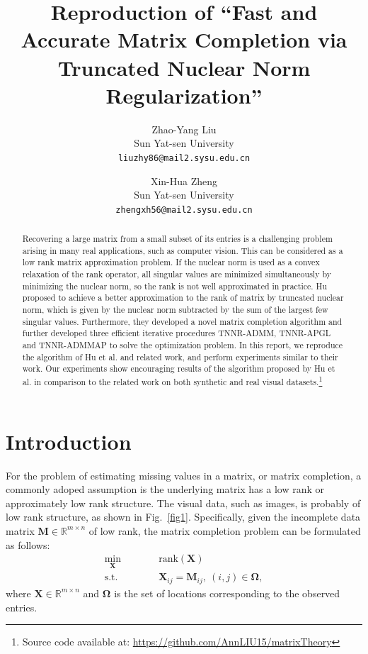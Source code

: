 \documentclass{article}
\title{Reproduction of ``Fast and Accurate Matrix Completion via Truncated Nuclear Norm Regularization''}
\author{%
  Zhao-Yang Liu\\ %
    Sun Yat-sen University \\
  \texttt{liuzhy86@mail2.sysu.edu.cn} \\
  \and
  Xin-Hua Zheng \\
  Sun Yat-sen University \\
  \texttt{zhengxh56@mail2.sysu.edu.cn} \\
}
\begin{document}
{

\maketitle

\begin{abstract}
Recovering a large matrix from a small subset of its entries is a challenging problem arising in many real applications, such as computer vision. This can be considered as a low rank matrix approximation problem. If the nuclear norm is used as a convex relaxation of the rank operator, all singular values are minimized simultaneously by minimizing the nuclear norm, so the rank is not well approximated in practice. 
Hu proposed to achieve a better approximation to the rank of matrix by truncated nuclear norm, which is given by the nuclear norm subtracted by the sum of the largest few singular values. Furthermore, they developed a novel matrix completion algorithm and further developed three efficient iterative procedures TNNR-ADMM, TNNR-APGL and TNNR-ADMMAP to solve the optimization problem.
In this report, we reproduce the algorithm of Hu et al. and related work, and perform experiments similar to their work. Our experiments show encouraging results of the algorithm proposed by Hu et al. in comparison to the related work on both synthetic and real visual datasets.\footnote{Source code available at: \url{https://github.com/AnnLIU15/matrixTheory}}
\end{abstract}


\section{Introduction}
For the problem of estimating missing values in a matrix, or matrix completion, a commonly adoped assumption is the underlying matrix has a low rank or approximately low rank structure.
The visual data, such as images, is probably of low rank structure, as shown in Fig.~\ref{fig1}.
Specifically, given the incomplete data matrix $\mathbf M \in \mathbb{R}^{m \times n}$ of low rank, the matrix completion problem can be formulated as follows:
\begin{equation}
    \begin{aligned}
        \min_{\mathbf X}\qquad&\quad \text{rank}(\mathbf X) \\
        \text{s.t.}\qquad&\quad\mathbf X_{ij} =\mathbf M_{ij}, \ (i,j) \in\mathbf \Omega,
    \end{aligned}
    \label{rmin}
\end{equation}
where $\mathbf X \in \mathbb{R}^{m \times n}$ and $\mathbf \Omega$ is the set of locations corresponding to the observed entries.

}
\end{document}
